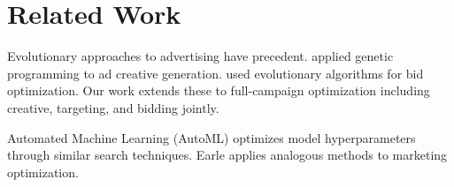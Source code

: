 \section{Related Work}


Evolutionary approaches to advertising have precedent. \cite{xiao2014} applied genetic programming to ad creative generation. \cite{kumar2015} used evolutionary algorithms for bid optimization. Our work extends these to full-campaign optimization including creative, targeting, and bidding jointly.

Automated Machine Learning (AutoML) \cite{automl2019} optimizes model hyperparameters through similar search techniques. Earle applies analogous methods to marketing optimization.

